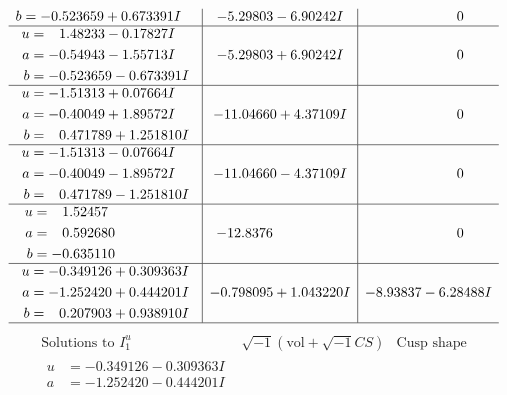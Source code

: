 \documentclass[1p]{elsarticle_modified}
\theoremstyle{definition}
\newcommand{\I}{\sqrt{-1}}
\begin{document}
$$\begin{array}{c|c|c}
\begin{aligned}
b &= -0.523659 + 0.673391 I\end{aligned}
 & -5.29803 - 6.90242 I & \phantom{-0.000000 } 0 \\ \hline\begin{aligned}
u &= \phantom{-}1.48233 - 0.17827 I \\
a &= -0.54943 - 1.55713 I \\
b &= -0.523659 - 0.673391 I\end{aligned}
 & -5.29803 + 6.90242 I & \phantom{-0.000000 } 0 \\ \hline\begin{aligned}
u &= -1.51313 + 0.07664 I \\
a &= -0.40049 + 1.89572 I \\
b &= \phantom{-}0.471789 + 1.251810 I\end{aligned}
 & -11.04660 + 4.37109 I & \phantom{-0.000000 } 0 \\ \hline\begin{aligned}
u &= -1.51313 - 0.07664 I \\
a &= -0.40049 - 1.89572 I \\
b &= \phantom{-}0.471789 - 1.251810 I\end{aligned}
 & -11.04660 - 4.37109 I & \phantom{-0.000000 } 0 \\ \hline\begin{aligned}
u &= \phantom{-}1.52457\phantom{ +0.000000I} \\
a &= \phantom{-}0.592680\phantom{ +0.000000I} \\
b &= -0.635110\phantom{ +0.000000I}\end{aligned}
 & -12.8376\phantom{ +0.000000I} & \phantom{-0.000000 } 0 \\ \hline\begin{aligned}
u &= -0.349126 + 0.309363 I \\
a &= -1.252420 + 0.444201 I \\
b &= \phantom{-}0.207903 + 0.938910 I\end{aligned}
 & -0.798095 + 1.043220 I & -8.93837 - 6.28488 I\\
 \hline 
 \end{array}$$\newpage$$\begin{array}{c|c|c}  
\text{Solutions to }I^u_{1}& \I (\text{vol} + \sqrt{-1}CS) & \text{Cusp shape}\\
 \hline 
\begin{aligned}
u &= -0.349126 - 0.309363 I \\
a &= -1.252420 - 0.444201 I \\

\end{aligned}
\end{array}$$
\end{document}
